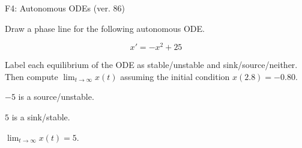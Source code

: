 \begin{exercise}
  \begin{exerciseTitle}F4: Autonomous ODEs (ver. 86)\end{exerciseTitle}
  \begin{exerciseStatement}
    

      Draw a phase line for the following 
      autonomous ODE.
    

    
\[x'= -x^{2} + 25\]

    

      Label each equilibrium of the ODE
      as stable/unstable and sink/source/neither.
      Then compute \(\lim_{t\to\infty}x(t)\)
      assuming the initial condition
      \(x( 2.8 )= -0.80\).
    

  \end{exerciseStatement}
  \begin{exerciseAnswer}
    

      \(-5\) is a source/unstable.
      
      \(5\) is a sink/stable.
    

    

      \(\lim_{t\to\infty}x(t)=5\).
    

  \end{exerciseAnswer}
\end{exercise}